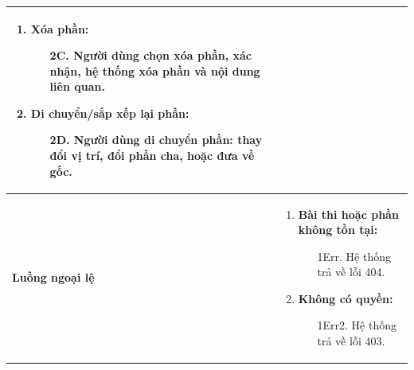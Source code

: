 {\begin{tabularx}{\textwidth}{|>{\raggedright\arraybackslash}X|>{\raggedright\arraybackslash}X|}
\begin{enumerate}
    \item \textbf{Xóa phần:}
    \begin{enumerate}
        \item[2C.] Người dùng chọn xóa phần, xác nhận, hệ thống xóa phần và nội dung liên quan.
    \end{enumerate}
    \item \textbf{Di chuyển/sắp xếp lại phần:}
    \begin{enumerate}
        \item[2D.] Người dùng di chuyển phần: thay đổi vị trí, đổi phần cha, hoặc đưa về gốc.
    \end{enumerate}
\end{enumerate} \\
\hline
\textbf{Luồng ngoại lệ} &
\begin{enumerate}
    \item \textbf{Bài thi hoặc phần không tồn tại:}
    \begin{enumerate}
        \item[1Err.] Hệ thống trả về lỗi 404.
    \end{enumerate}
    \item \textbf{Không có quyền:}
    \begin{enumerate}
        \item[1Err2.] Hệ thống trả về lỗi 403.
    \end{enumerate}
\end{enumerate} \\
\hline
\end{tabularx}
}
